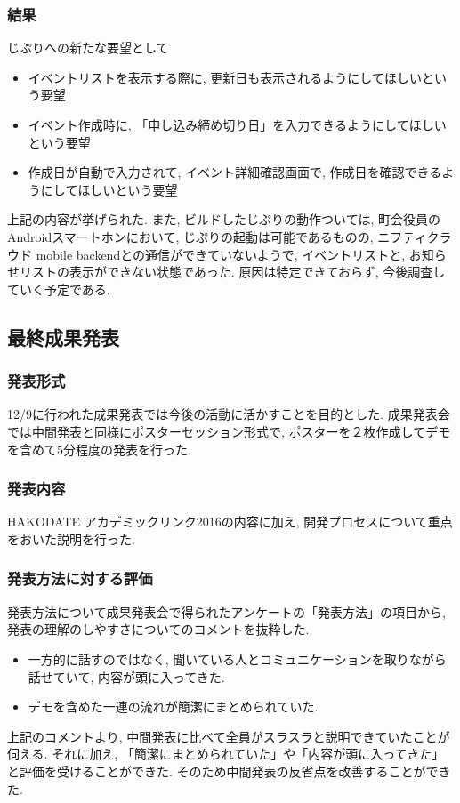 \subsubsection{結果}
じぷりへの新たな要望として
\begin{itemize}
    \item イベントリストを表示する際に, 更新日も表示されるようにしてほしいという要望
    \item イベント作成時に, 「申し込み締め切り日」を入力できるようにしてほしいという要望
    \item 作成日が自動で入力されて, イベント詳細確認画面で, 作成日を確認できるようにしてほしいという要望
\end{itemize}
上記の内容が挙げられた.
また, ビルドしたじぷりの動作ついては,
町会役員のAndroidスマートホンにおいて, じぷりの起動は可能であるものの, ニフティクラウド mobile backendとの通信ができていないようで,
イベントリストと, お知らせリストの表示ができない状態であった. 原因は特定できておらず, 今後調査していく予定である.

\subsection{最終成果発表}
\subsubsection{発表形式}
12/9に行われた成果発表では今後の活動に活かすことを目的とした. 成果発表会では中間発表と同様にポスターセッション形式で, ポスターを２枚作成してデモを含めて5分程度の発表を行った.
\subsubsection{発表内容}
HAKODATE アカデミックリンク2016の内容に加え, 開発プロセスについて重点をおいた説明を行った.
\subsubsection{発表方法に対する評価}
発表方法について成果発表会で得られたアンケートの「発表方法」の項目から,  発表の理解のしやすさについてのコメントを抜粋した.
\begin{itemize}
    \item 一方的に話すのではなく, 聞いている人とコミュニケーションを取りながら話せていて, 内容が頭に入ってきた.
　\item デモを含めた一連の流れが簡潔にまとめられていた.
\end{itemize}
上記のコメントより, 中間発表に比べて全員がスラスラと説明できていたことが伺える. それに加え, 「簡潔にまとめられていた」や「内容が頭に入ってきた」と評価を受けることができた. そのため中間発表の反省点を改善することができた.
